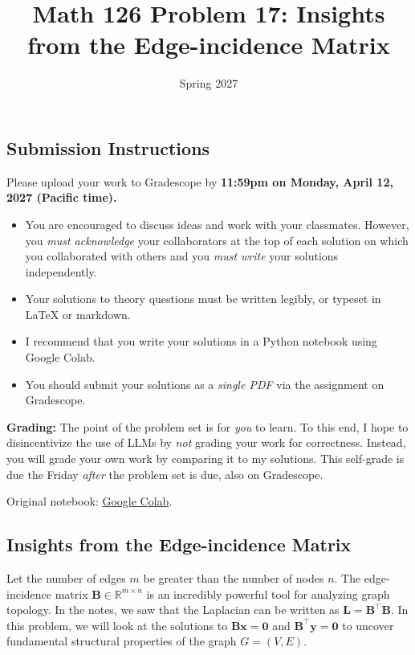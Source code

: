 \documentclass{article}
\title{Math 126 Problem 17: Insights from the Edge-incidence Matrix}
\author{} %
\date{Spring 2027}
\begin{document}
\maketitle

\hypertarget{submission-instructions}{%
\subsection*{Submission Instructions}\label{submission-instructions}}

Please upload your work to Gradescope by \textbf{11:59pm on Monday, April 12, 2027 (Pacific time).}

\begin{itemize}
\item
  You are encouraged to discuss ideas and work with your classmates. However, you \emph{must acknowledge} your collaborators at the top of each solution on which you collaborated with others and you \emph{must write} your solutions independently.
\item
  Your solutions to theory questions must be written legibly, or typeset in LaTeX or markdown.
\item
  I recommend that you write your solutions in a Python notebook using Google Colab.
\item
  You should submit your solutions as a \emph{single PDF} via the assignment on Gradescope.
\end{itemize}

\textbf{Grading:} The point of the problem set is for \emph{you} to learn. To this end, I hope to disincentivize the use of LLMs by \emph{not} grading your work for correctness. Instead, you will grade your own work by comparing it to my solutions. This self-grade is due the Friday \emph{after} the problem set is due, also on Gradescope.

\noindent Original notebook: \href{https://colab.research.google.com/drive/16aOkT_-N2JFFow9si7DhIcgfnASXi8wt?usp=sharing}{Google Colab}.

\hypertarget{insights-from-the-edge-incidence-matrix}{%
\subsection*{Insights from the Edge-incidence Matrix}\label{insights-from-the-edge-incidence-matrix}}

Let the number of edges \(m\) be greater than the number of nodes \(n\). The edge-incidence matrix \(\mathbf{B} \in \mathbb{R}^{m \times n}\) is an incredibly powerful tool for analyzing graph topology. In the notes, we saw that the Laplacian can be written as \(\mathbf{L} = \mathbf{B}^\top \mathbf{B}\). In this problem, we will look at the solutions to \(\mathbf{B}\mathbf{x} = \mathbf{0}\) and \(\mathbf{B}^\top\mathbf{y} = \mathbf{0}\) to uncover fundamental structural properties of the graph \(G=(V,E)\).
\end{document}
